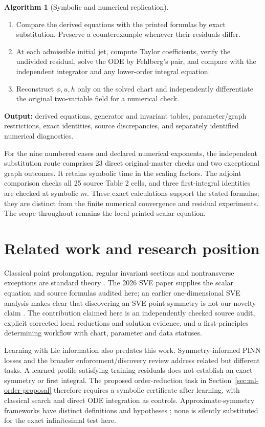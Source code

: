 \documentclass[11pt]{article}
\theoremstyle{definition}
\newtheorem{algorithm}{Algorithm}[section]
\begin{document}
\begin{minipage}{\linewidth}
\begin{algorithm}[Symbolic and numerical replication]
\begin{enumerate}
\item Compare the derived equations with the printed formulas by exact
      substitution. Preserve a counterexample whenever their residuals differ.
\item At each admissible initial jet, compute Taylor coefficients, verify
      the undivided residual, solve the ODE by Fehlberg's pair, and compare
      with the independent integrator and any lower-order integral equation.
\item Reconstruct $\phi,u,h$ only on the solved chart and independently
      differentiate the original two-variable field for a numerical check.
\end{enumerate}
\textbf{Output:} derived equations, generator and invariant tables,
parameter/graph restrictions, exact identities, source discrepancies,
and separately identified numerical diagnostics.
\end{algorithm}
\end{minipage}\par

For the nine numbered cases and declared numerical exponents, the
independent substitution route comprises 23 direct original-master checks
and two exceptional graph outcomes. It retains symbolic time in the
scaling factors. The adjoint comparison checks all 25 source Table 2
cells, and three first-integral identities are checked at symbolic $m$.
These exact calculations support the stated formulas; they are distinct
from the finite numerical convergence and residual experiments.
The scope throughout remains the local printed scalar equation.


\section{Related work and research position}
Classical point prolongation, regular invariant sections and nontransverse
exceptions are standard theory \cite{olver,oliveri2026,anderson2000}. The
2026 SVE paper supplies the scalar equation and source formulas audited here;
an earlier one-dimensional SVE analysis makes clear that discovering an SVE
point symmetry is not our novelty claim \cite{ap,sveold}. The contribution
claimed here is an independently checked source audit, explicit corrected
local reductions and solution evidence, and a first-principles determining
workflow with chart, parameter and data statuses.

Learning with Lie information also predates this work. Symmetry-informed
PINN losses \cite{sympinn} and the broader enforcement/discovery review
\cite{otto} address related but different tasks. A learned profile satisfying
training residuals does not establish an exact symmetry or first integral.
The proposed order-reduction task in Section~\ref{sec:ml-order-proposal}
therefore requires a symbolic certificate after learning, with classical
search and direct ODE integration as controls. Approximate-symmetry
frameworks have distinct definitions and hypotheses \cite{tarayrah2023,approxalg};
none is silently substituted for the exact infinitesimal test here.
\end{document}
